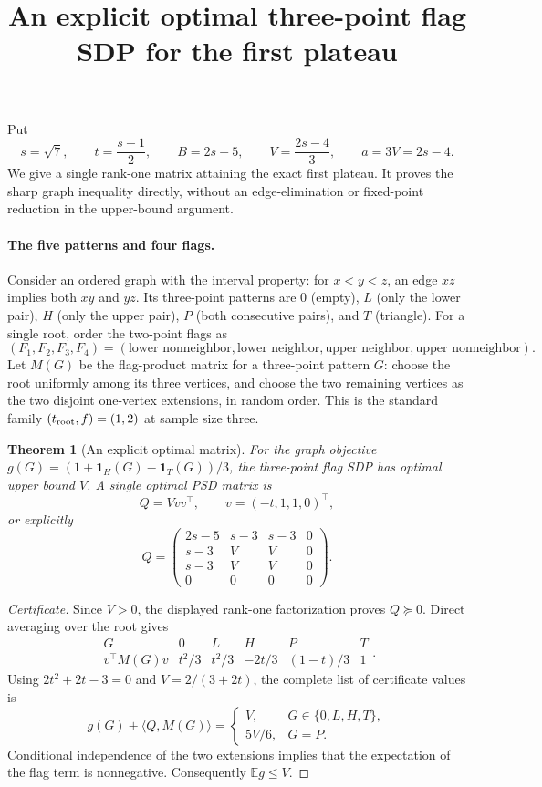 \documentclass[11pt]{article}
\newtheorem{theorem}{Theorem}
\begin{document}
\title{An explicit optimal three-point flag SDP for the first plateau}
\author{}\date{}\maketitle
Put
\[
s=\sqrt7,\qquad t=\frac{s-1}{2},\qquad
B=2s-5,\qquad V=\frac{2s-4}{3},\qquad a=3V=2s-4.
\]
We give a single rank-one matrix attaining the exact first plateau.
It proves the sharp graph inequality directly, without an edge-elimination
or fixed-point reduction in the upper-bound argument.

\paragraph{The five patterns and four flags.}
Consider an ordered graph with the interval property: for $x<y<z$,
an edge $xz$ implies both $xy$ and $yz$.
Its three-point patterns are $0$ (empty), $L$ (only the lower pair),
$H$ (only the upper pair), $P$ (both consecutive pairs), and $T$ (triangle).
For a single root, order the two-point flags as
\[
(F_1,F_2,F_3,F_4)
=(\text{lower nonneighbor},\text{lower neighbor},
  \text{upper neighbor},\text{upper nonneighbor}).
\]
Let $M(G)$ be the flag-product matrix for a three-point pattern $G$:
choose the root uniformly among its three vertices, and choose the two
remaining vertices as the two disjoint one-vertex extensions, in random
order. This is the standard family $(t_{\rm root},f)=(1,2)$ at sample
size three.

\begin{theorem}[An explicit optimal matrix]
For the graph objective $g(G)=(1+\mathbf1_H(G)-\mathbf1_T(G))/3$,
the three-point flag SDP has optimal upper bound $V$.
A single optimal PSD matrix is
\[
\boxed{
Q=Vvv^\top,
\qquad v=(-t,1,1,0)^\top,
}
\]
or explicitly
\[
Q=\begin{pmatrix}
2s-5&s-3&s-3&0\\
s-3&V&V&0\\
s-3&V&V&0\\
0&0&0&0
\end{pmatrix}.
\]
\end{theorem}
\begin{proof}[Certificate]
Since $V>0$, the displayed rank-one factorization proves $Q\succeq0$.
Direct averaging over the root gives
\[
\begin{array}{c|ccccc}
G&0&L&H&P&T\\\hline
v^\top M(G)v&t^2/3&t^2/3&-2t/3&(1-t)/3&1
\end{array}.
\]
Using $2t^2+2t-3=0$ and $V=2/(3+2t)$, the complete list of
certificate values is
\[
\boxed{
g(G)+\langle Q,M(G)\rangle=
\begin{cases}
V,&G\in\{0,L,H,T\},\\
5V/6,&G=P.
\end{cases}}
\]
Conditional independence of the two extensions implies that the
expectation of the flag term is nonnegative. Consequently $\mathbb E g\le V$.
\end{proof}
\end{document}
